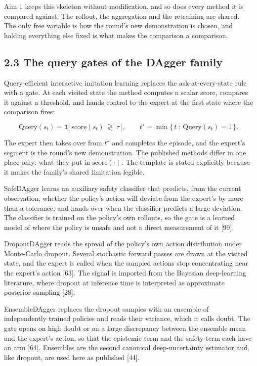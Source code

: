 \documentclass[
  11pt,
]{article}
\begin{document}
Aim 1 keeps this skeleton without modification, and so does every method
it is compared against. The rollout, the aggregation and the retraining
are shared. The only free variable is how the round's new demonstration
is chosen, and holding everything else fixed is what makes the
comparison a comparison.

\hypertarget{the-query-gates-of-the-dagger-family}{%
\subsection{2.3 The query gates of the DAgger
family}\label{the-query-gates-of-the-dagger-family}}

Query-efficient interactive imitation learning replaces the
ask-at-every-state rule with a gate. At each visited state the method
computes a scalar score, compares it against a threshold, and hands
control to the expert at the first state where the comparison fires:

\[\mathrm{Query}(s_t) = \mathbf{1}\big[\ \mathrm{score}(s_t) \ \gtrless \ \tau \ \big],
\qquad
t^\star = \min \{\, t \ : \ \mathrm{Query}(s_t) = 1 \,\}.\]

The expert then takes over from \(t^\star\) and completes the episode,
and the expert's segment is the round's new demonstration. The published
methods differ in one place only: what they put in
\(\mathrm{score}(\cdot)\). The template is stated explicitly because it
makes the family's shared limitation legible.

SafeDAgger learns an auxiliary safety classifier that predicts, from the
current observation, whether the policy's action will deviate from the
expert's by more than a tolerance, and hands over when the classifier
predicts a large deviation. The classifier is trained on the policy's
own rollouts, so the gate is a learned model of where the policy is
unsafe and not a direct measurement of it {[}99{]}.

DropoutDAgger reads the spread of the policy's own action distribution
under Monte-Carlo dropout. Several stochastic forward passes are drawn
at the visited state, and the expert is called when the sampled actions
stop concentrating near the expert's action {[}63{]}. The signal is
imported from the Bayesian deep-learning literature, where dropout at
inference time is interpreted as approximate posterior sampling
{[}28{]}.

EnsembleDAgger replaces the dropout samples with an ensemble of
independently trained policies and reads their variance, which it calls
doubt. The gate opens on high doubt or on a large discrepancy between
the ensemble mean and the expert's action, so that the epistemic term
and the safety term each have an arm {[}64{]}. Ensembles are the second
canonical deep-uncertainty estimator and, like dropout, are used here as
published {[}44{]}.
\end{document}
